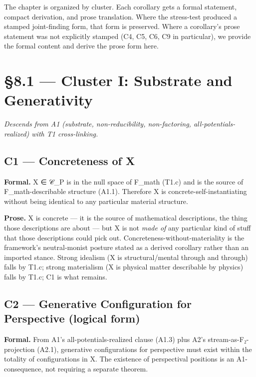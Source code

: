 \documentclass[11pt, openany]{book}
\newcommand{\sectionbreak}{\clearpage}
\begin{document}
The chapter is organized by cluster. Each corollary gets a formal statement, compact derivation, and prose translation. Where the stress-test produced a stamped joint-finding form, that form is preserved. Where a corollary's prose statement was not explicitly stamped (C4, C5, C6, C9 in particular), we provide the formal content and derive the prose form here.

\sectionbreak

\section{§8.1 --- Cluster I: Substrate and Generativity}

\textit{Descends from A1 (substrate, non-reducibility, non-factoring, all-potentials-realized) with T1 cross-linking.}

\subsection{C1 --- Concreteness of X}

\textbf{Formal.} X ∈ 𝒞\_\allowbreak{}P is in the null space of F\_\allowbreak{}math (T1.c) and is the source of F\_\allowbreak{}math-describable structure (A1.1). Therefore X is concrete-self-instantiating without being identical to any particular material structure.

\textbf{Prose.} X is concrete --- it is the source of mathematical descriptions, the thing those descriptions are about --- but X is not \textit{made of} any particular kind of stuff that those descriptions could pick out. Concreteness-without-materiality is the framework's neutral-monist posture stated as a derived corollary rather than an imported stance. Strong idealism (X is structural/mental through and through) falls by T1.c; strong materialism (X is physical matter describable by physics) falls by T1.c; C1 is what remains.

\subsection{C2 --- Generative Configuration for Perspective (logical form)}

\textbf{Formal.} From A1's all-potentials-realized clause (A1.3) plus A2's stream-as-F₂-projection (A2.1), generative configurations for perspective must exist within the totality of configurations in X. The existence of perspectival positions is an A1-consequence, not requiring a separate theorem.
\end{document}
